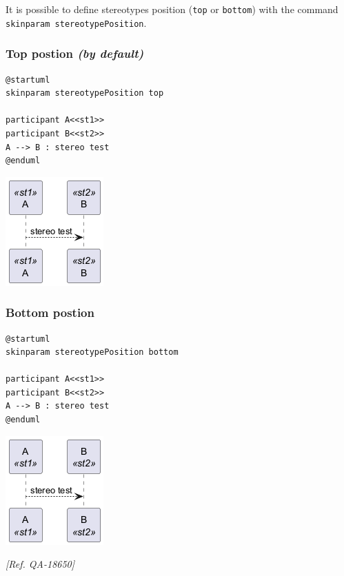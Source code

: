 It is possible to define stereotypes position (\texttt{top} or \texttt{bottom}) with the command \texttt{skinparam stereotypePosition}.


\subsubsection{Top postion \textit{(by default)}}
\begin{verbatim}
@startuml
skinparam stereotypePosition top

participant A<<st1>>
participant B<<st2>>
A --> B : stereo test
@enduml
\end{verbatim}
\begin{center}
\includegraphics[scale=0.60]{imgw/img-577bd0705f25270e47361949c653baa9.png}
\end{center}


\subsubsection{Bottom postion}
\begin{verbatim}
@startuml
skinparam stereotypePosition bottom

participant A<<st1>>
participant B<<st2>>
A --> B : stereo test
@enduml
\end{verbatim}
\begin{center}
\includegraphics[scale=0.60]{imgw/img-dd969edfbd5e760b6b839d17d649de4c.png}
\end{center}


\textit{[Ref. QA-18650]}
%
%
